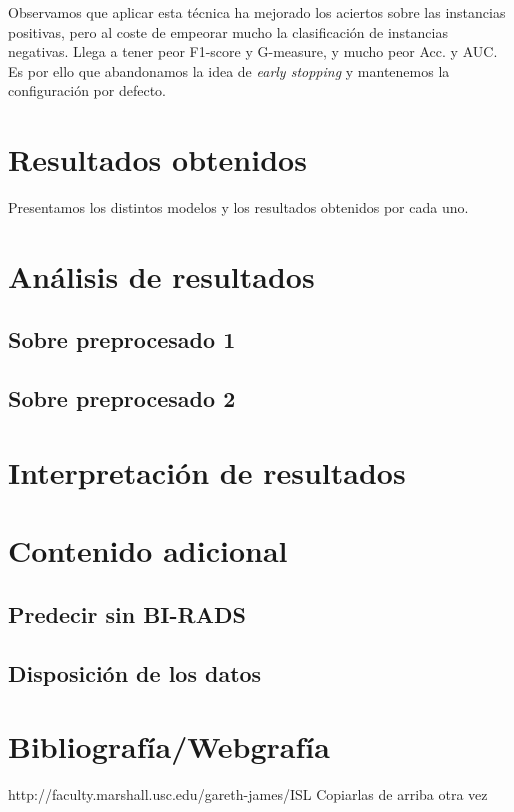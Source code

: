 \documentclass{article}
\begin{document}
Observamos que aplicar esta técnica ha mejorado los aciertos sobre las
instancias positivas, pero al coste de empeorar mucho la clasificación
de instancias negativas. Llega a tener peor F1-score y G-measure, y
mucho peor Acc. y AUC. Es por ello que abandonamos la idea de
\emph{early stopping} y mantenemos la configuración por defecto.

\section{Resultados obtenidos} \label{sec:resultados}

Presentamos los distintos modelos y los resultados obtenidos por cada
uno.

\section{Análisis de resultados} \label{sec:analisis}

\subsection{Sobre preprocesado 1}

\subsection{Sobre preprocesado 2}

\section{Interpretación de resultados}

\section{Contenido adicional}

\subsection{Predecir sin BI-RADS}

\subsection{Disposición de los datos}


\section{Bibliografía/Webgrafía}

http://faculty.marshall.usc.edu/gareth-james/ISL
Copiarlas de arriba otra vez
\end{document}
